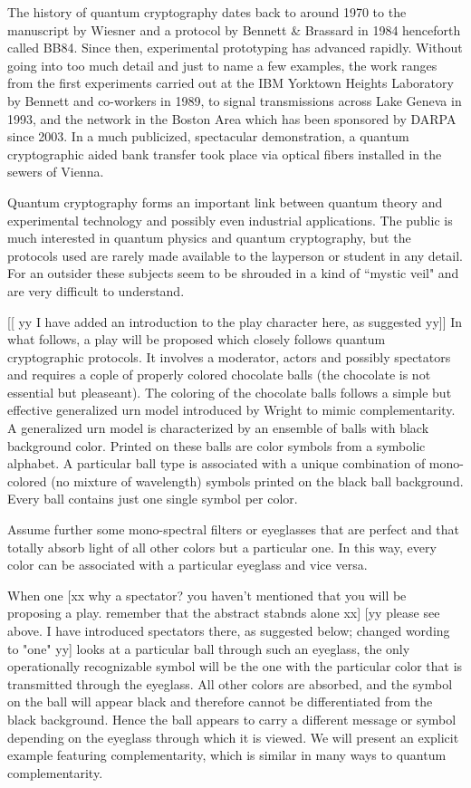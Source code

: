 \documentclass[prb,amssymb,preprint]{revtex4}
\begin{document}
The history of quantum cryptography dates back to around 1970 to the
manuscript by Wiesner\cite{wiesner} and a protocol
by Bennett \& Brassard\cite{benn-82,benn-84,ekert91,benn-92,gisin-qc-rmp}
in 1984 henceforth called BB84. Since
then, experimental prototyping has advanced rapidly.
Without going into too
much detail and just to name a few examples, the work ranges from the
first experiments carried out at the IBM Yorktown Heights Laboratory
by Bennett and co-workers in
1989,\cite{benn-92}
to signal transmissions across Lake Geneva in 1993,\cite{gisin-qc-rmp} and
the network in the Boston Area which has been sponsored by DARPA since
2003.\cite{ell-co-05} In a much publicized, spectacular demonstration, a
quantum cryptographic aided bank transfer took place via optical fibers
installed in the sewers of Vienna.\cite{pflmubpskwjz}

Quantum cryptography forms an important link between quantum theory and
experimental technology and possibly even industrial applications. The
public is much interested in quantum physics and quantum cryptography, but
the protocols used are rarely made available to the layperson or student in
any detail. For an outsider these subjects seem to be shrouded in a kind
of ``mystic veil" and are very difficult to understand.


[[ yy I have added an introduction to the play character here, as suggested yy]]
In what follows,
a play will be proposed which closely follows quantum cryptographic protocols.
It involves a moderator, actors and possibly spectators
and requires a cople of properly colored chocolate balls
(the chocolate is not essential but pleaseant).
The coloring of the chocolate balls follows
a simple but effective generalized urn
model introduced by Wright\cite{wright,wright:pent,svozil-2001-eua} to mimic
complementarity. A generalized urn model is
characterized by an ensemble of balls with black background color.
Printed on these balls are color symbols from a symbolic alphabet.
A particular ball type is associated with a unique combination of
mono-colored (no mixture of wavelength) symbols printed on the black ball
background. Every ball contains just one single symbol per color.

Assume further some mono-spectral filters or eyeglasses that are
perfect and that totally absorb light of all other colors
but a particular one.
In this way, every color can be associated with a particular eyeglass and
vice versa.

When one
[xx why a spectator? you haven't mentioned that you
will be proposing a play. remember that the abstract stabnds alone xx]
[yy please see above. I have introduced spectators there, as suggested below; changed wording to "one" yy]
looks
at a particular ball through such an eyeglass, the only operationally
recognizable symbol will be the one with the particular color that is
transmitted through the eyeglass. All other colors are absorbed, and the
symbol on the ball will appear black and therefore cannot be
differentiated from the black background. Hence the ball appears to carry a
different message or symbol depending on the eyeglass through which it is
viewed. We will present an explicit example featuring complementarity, which
is similar in many ways to quantum complementarity.
\end{document}

